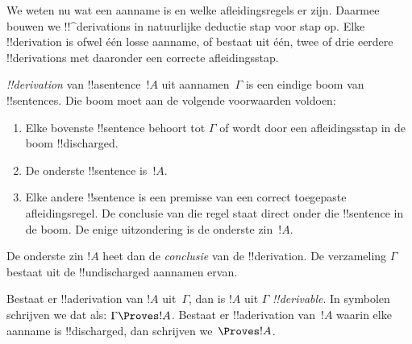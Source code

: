 \documentclass[../../../include/open-logic-section]{subfiles}
\begin{document}
      {}
      {}


\begin{explain}
We weten nu wat een aanname is en welke afleidingsregels er zijn.
Daarmee bouwen we !!^{derivation}s in natuurlijke deductie stap voor
stap op. Elke !!{derivation} is ofwel één losse aanname, of bestaat uit
één, twee of drie eerdere !!{derivation}s met daaronder een
correcte afleidingsstap.
\end{explain}

\begin{defn}[!!^{derivation}]
 \emph{!!{derivation}} van !!a{sentence}~$!A$ uit
aannamen~$\Gamma$ is een eindige boom van !!{sentence}s. Die boom moet
aan de volgende voorwaarden voldoen:
\begin{enumerate}
\item Elke bovenste !!{sentence} behoort tot $\Gamma$ of wordt door een
  afleidingsstap in de boom !!{discharged}.
\item De onderste !!{sentence} is~$!A$.
\item Elke andere !!{sentence} is een premisse van een correct
  toegepaste afleidingsregel. De conclusie van die regel staat direct
  onder die !!{sentence} in de boom. De enige uitzondering is de
  onderste zin~$!A$.
\end{enumerate}
De onderste zin $!A$ heet dan de \emph{conclusie} van de
!!{derivation}. De verzameling $\Gamma$ bestaat uit de
!!{undischarged} aannamen ervan.

Bestaat er !!a{derivation} van $!A$ uit~$\Gamma$, dan is $!A$ uit
$\Gamma$ \emph{!!{derivable}}. In symbolen schrijven we dat als:
$\Gamma \Proves !A$. Bestaat er !!a{derivation} van~$!A$ waarin elke
aanname is !!{discharged}, dan schrijven we~$\Proves !A$.
\end{defn}
\end{document}
